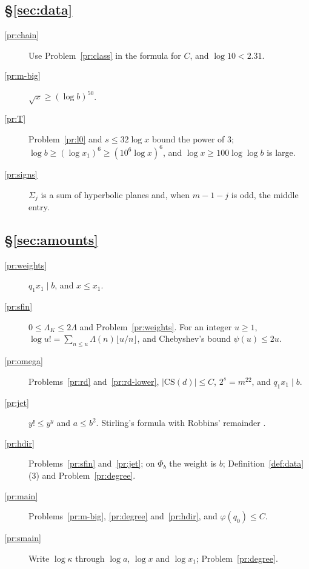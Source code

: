 \documentclass[reqno]{amsart}
\theoremstyle{plain}
\theoremstyle{definition}
\newcommand{\CS}{\mathrm{CS}}
\begin{document}
\subsection*{\S\ref{sec:data}}
\begin{description}
\item[\ref{pr:chain}] Use Problem~\ref{pr:class} in the formula for \(C\), and \(\log 10 < 2.31\).
\item[\ref{pr:m-big}] \(\sqrt x \ge (\log b)^{50}\).
\item[\ref{pr:T}] Problem~\ref{pr:l0} and \(s \le 32\log x\) bound the power of \(3\); \(\log b \ge (\log x_1)^6 \ge (10^6 \log x)^6\), and \(\log x \ge 100\log\log b\) is large.
\item[\ref{pr:signs}] \(\Sigma_j\) is a sum of hyperbolic planes and, when \(m - 1 - j\) is odd, the middle entry.
\end{description}

\subsection*{\S\ref{sec:amounts}}
\begin{description}
\item[\ref{pr:weights}] \(q_1 x_1 \mid b\), and \(x \le x_1\).
\item[\ref{pr:sfin}] \(0 \le \Lambda_K \le 2\Lambda\) and Problem~\ref{pr:weights}.  For an integer \(u \ge 1\), \(\log u! = \sum_{n \le u} \Lambda(n)\lfloor u/n \rfloor\), and Chebyshev's bound \(\psi(u) \le 2u\).
\item[\ref{pr:omega}] Problems~\ref{pr:rd} and~\ref{pr:rd-lower}, \(\lvert\CS(d)\rvert \le C\), \(2^{s} = m^{22}\), and \(q_1 x_1 \mid b\).
\item[\ref{pr:jet}] \(y! \le y^y\) and \(a \le b^2\).  Stirling's formula with Robbins' remainder \cite{Rob}.
\item[\ref{pr:hdir}] Problems~\ref{pr:sfin} and~\ref{pr:jet}; on \(\Phi_b\) the weight is \(b\); Definition~\ref{def:data}(3) and Problem~\ref{pr:degree}.
\item[\ref{pr:main}] Problems~\ref{pr:m-big}, \ref{pr:degree} and~\ref{pr:hdir}, and \(\varphi(q_0) \le C\).
\item[\ref{pr:smain}] Write \(\log \kappa\) through \(\log a\), \(\log x\) and \(\log x_1\); Problem~\ref{pr:degree}.
\end{description}
\end{document}
